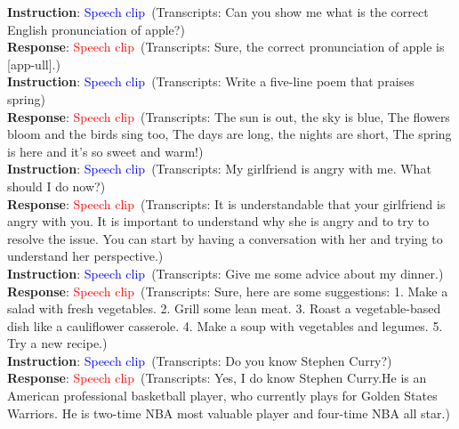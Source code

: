 \begin{table*}[t!]\centering
\begin{tcolorbox}[width=1\textwidth, fontupper=\fontsize{10}{12}\selectfont]

\textbf{Instruction}: \textcolor{blue}{Speech clip}~(Transcripts: Can you show me what is the correct English pronunciation of apple?)\\
\textbf{Response}: \textcolor{red}{Speech clip}~(Transcripts:  Sure, the correct pronunciation of apple is [app-ull].)\\

\textbf{Instruction}: \textcolor{blue}{Speech clip}~(Transcripts: Write a five-line poem that praises spring)\\
\textbf{Response}: \textcolor{red}{Speech clip}~(Transcripts: The sun is out, the sky is blue,
The flowers bloom and the birds sing too,
The days are long, the nights are short,
The spring is here and it's so sweet and warm!)\\

\textbf{Instruction}: \textcolor{blue}{Speech clip}~(Transcripts: My girlfriend is angry with me. What should I do now?)\\
\textbf{Response}: \textcolor{red}{Speech clip}~(Transcripts: It is understandable that your girlfriend is angry with you. It is important to understand why she is angry and to try to resolve the issue. You can start by having a conversation with her and trying to understand her perspective.)\\

\textbf{Instruction}: \textcolor{blue}{Speech clip}~(Transcripts: Give me some advice about my dinner.)\\
\textbf{Response}: \textcolor{red}{Speech clip}~(Transcripts: Sure, here are some suggestions: 
1. Make a salad with fresh vegetables. 
2. Grill some lean meat. 
3. Roast a vegetable-based dish like a cauliflower casserole. 
4. Make a soup with vegetables and legumes. 
5. Try a new recipe.)\\

\textbf{Instruction}: \textcolor{blue}{Speech clip}~(Transcripts: Do you know Stephen Curry?)\\
\textbf{Response}: \textcolor{red}{Speech clip}~(Transcripts: Yes, I do know Stephen Curry.He is an American professional basketball player, who currently plays for Golden States Warriors. He is two-time NBA most valuable player and four-time NBA all star.)\\


\end{tcolorbox}
\end{table*}
